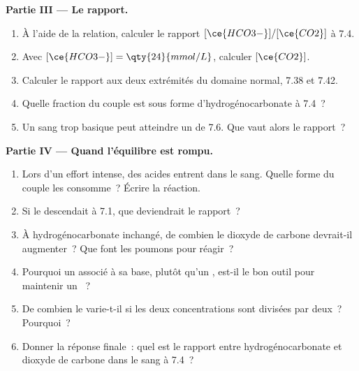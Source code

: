 \begin{problem}
\medskip
\noindent\textbf{Partie III --- Le rapport.}
\begin{enumerate}[resume]
  \item À l'aide de la relation, calculer le rapport
        $[\ce{HCO3-}]/[\ce{CO2}]$
        à  7.4.
  \item Avec $[\ce{HCO3-}] = \qty{24}{mmol/L}$, calculer $[\ce{CO2}]$.
  \item Calculer le rapport aux deux extrémités du domaine normal, 7.38
        et 7.42.
  \item Quelle fraction du couple est sous forme d'hydrogénocarbonate à
         7.4~?
  \item Un sang trop basique peut atteindre un  de 7.6. Que vaut alors
        le rapport~?
\end{enumerate}

\medskip
\noindent\textbf{Partie IV --- Quand l'équilibre est rompu.}
\begin{enumerate}[resume]
  \item Lors d'un effort intense, des acides entrent dans le sang. Quelle
        forme du couple les consomme~? Écrire la réaction.
  \item Si le  descendait à 7.1, que deviendrait le rapport~?
  \item À hydrogénocarbonate inchangé, de combien le dioxyde de carbone
        devrait-il augmenter~? Que font les poumons pour réagir~?
  \item Pourquoi un  associé à sa base, plutôt qu'un , est-il le bon outil pour maintenir un ~?
  \item De combien le  varie-t-il si les deux concentrations sont
        divisées par deux~? Pourquoi~?
  \item Donner la réponse finale~: quel est le rapport entre
        hydrogénocarbonate et dioxyde de carbone dans le sang à  7.4~?
\end{enumerate}
\end{problem}

